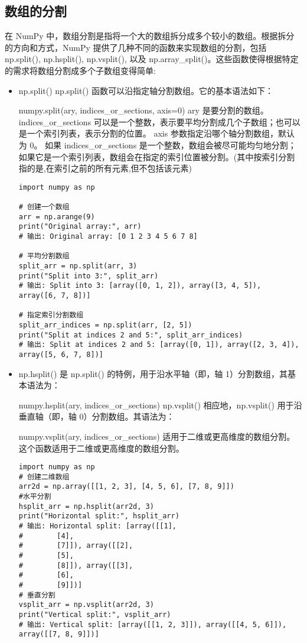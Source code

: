 \documentclass{article}
\begin{document}
\subsection{数组的分割}
在 NumPy 中，数组分割是指将一个大的数组拆分成多个较小的数组。根据拆分的方向和方式，NumPy 提供了几种不同的函数来实现数组的分割，包括 np.split(), np.hsplit(), np.vsplit(), 以及 np.array\_split()。这些函数使得根据特定的需求将数组分割成多个子数组变得简单:
\begin{itemize}
  

    \item np.split()
np.split() 函数可以沿指定轴分割数组。它的基本语法如下：

numpy.split(ary, indices\_or\_sections, axis=0)
ary 是要分割的数组。
indices\_or\_sections 可以是一个整数，表示要平均分割成几个子数组；也可以是一个索引列表，表示分割的位置。
axis 参数指定沿哪个轴分割数组，默认为 0。
如果 indices\_or\_sections 是一个整数，数组会被尽可能均匀地分割；如果它是一个索引列表，数组会在指定的索引位置被分割。(其中按索引分割指的是,在索引之前的所有元素,但不包括该元素)
\begin{lstlisting}[caption={示例Python代码}]
import numpy as np

# 创建一个数组
arr = np.arange(9)
print("Original array:", arr)
# 输出: Original array: [0 1 2 3 4 5 6 7 8]

# 平均分割数组
split_arr = np.split(arr, 3)
print("Split into 3:", split_arr)
# 输出: Split into 3: [array([0, 1, 2]), array([3, 4, 5]), array([6, 7, 8])]

# 指定索引分割数组
split_arr_indices = np.split(arr, [2, 5])
print("Split at indices 2 and 5:", split_arr_indices)
# 输出: Split at indices 2 and 5: [array([0, 1]), array([2, 3, 4]), array([5, 6, 7, 8])]
\end{lstlisting}
\item np.hsplit() 是 np.split() 的特例，用于沿水平轴（即，轴 1）分割数组，其基本语法为：

numpy.hsplit(ary, indices\_or\_sections)
np.vsplit()
相应地，np.vsplit() 用于沿垂直轴（即，轴 0）分割数组。其语法为：

numpy.vsplit(ary, indices\_or\_sections)
适用于二维或更高维度的数组分割。
这个函数适用于二维或更高维度的数组分割。
\begin{lstlisting}[caption={示例Python代码}]
import numpy as np
# 创建二维数组
arr2d = np.array([[1, 2, 3], [4, 5, 6], [7, 8, 9]])
#水平分割
hsplit_arr = np.hsplit(arr2d, 3)
print("Horizontal split:", hsplit_arr)
# 输出: Horizontal split: [array([[1],
#        [4],
#        [7]]), array([[2],
#        [5],
#        [8]]), array([[3],
#        [6],
#        [9]])]
# 垂直分割
vsplit_arr = np.vsplit(arr2d, 3)
print("Vertical split:", vsplit_arr)
# 输出: Vertical split: [array([[1, 2, 3]]), array([[4, 5, 6]]), array([[7, 8, 9]])]
\end{lstlisting}
\end{itemize}
\end{document}
